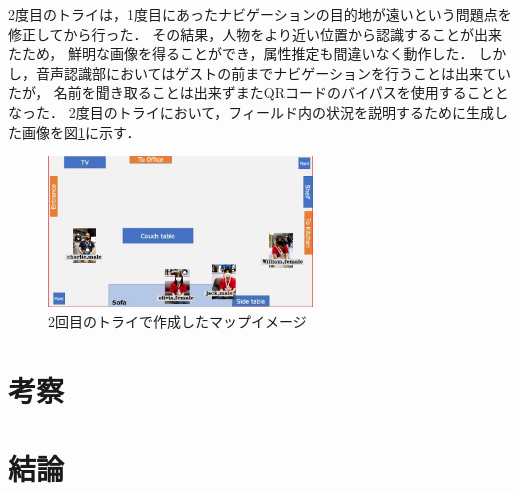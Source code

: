 \documentclass[a4j]{jarticle}
\begin{document}
2度目のトライは，1度目にあったナビゲーションの目的地が遠いという問題点を修正してから行った．
その結果，人物をより近い位置から認識することが出来たため，
鮮明な画像を得ることができ，属性推定も間違いなく動作した．
しかし，音声認識部においてはゲストの前までナビゲーションを行うことは出来ていたが，
名前を聞き取ることは出来ずまたQRコードのバイパスを使用することとなった．
2度目のトライにおいて，フィールド内の状況を説明するために生成した画像を図\ref{result_FMM_2}に示す．
\begin{figure}[ht]
  \centering
  \includegraphics[width=7cm]{images/FMM/mapimage.png}
  \caption{2回目のトライで作成したマップイメージ}
  \label{result_FMM_2}
\end{figure}



\section{考察}


\section{結論}
\end{document}
